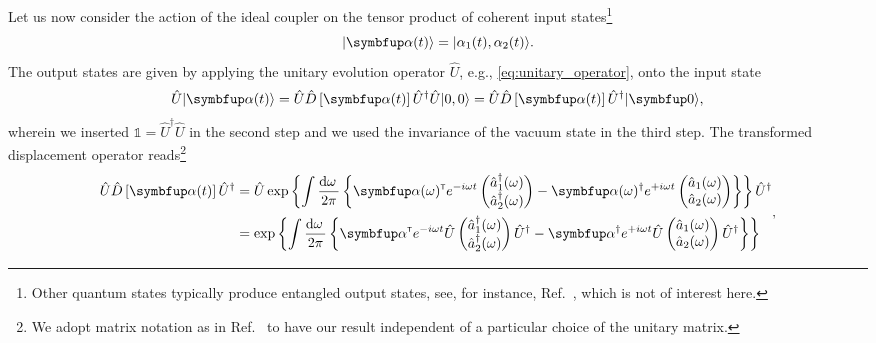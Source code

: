 Let us now consider the action of the ideal coupler on the tensor product of coherent input states\footnote{Other quantum states typically produce entangled output states, see, for instance, Ref.~\cite{Windhager2011}, which is not of interest here.}
\begin{equation}
	\ket*{\vb{\alpha}(t)}
	=
	\ket*{\alpha_1(t),\alpha_2(t)}
	.
\end{equation}
The output states are given by applying the unitary evolution operator $\hat{U}$, e.g., \cref{eq:unitary_operator}, onto the input state
\begin{equation}
	\hat{U}
	\ket*{\vb{\alpha}(t)}
	=
	\hat{U}
	\hat{D}\left[\vb{\alpha}(t)\right]
	\hat{U}^\dagger
	\hat{U}
	\ket*{0,0}
	=
	\hat{U}
	\hat{D}\left[\vb{\alpha}(t)\right]
	\hat{U}^\dagger
	\vacuum
	,
\end{equation}
wherein we inserted $\mathbb{1}=\hat{U}^\dagger\hat{U}$ in the second step and we used the invariance of the vacuum state in the third step.
The transformed displacement operator reads\footnote{We adopt matrix notation as in Ref.~\cite[p.~206]{Vogel2006} to have our result independent of a particular choice of the unitary matrix.}
\begin{equation}
	\begin{split}
		\hat{U}
		\hat{D}\left[\vb{\alpha}(t)\right]
		\hat{U}^\dagger
		&=
		\hat{U}
		\exp\left\{
			\int\frac{\dd{\omega}}{2\pi}
			\left\{
				\vb{\alpha}(\omega)^\trans
				e^{-i\omega t}
				\begin{pmatrix}
					\hat{a}_1^\dagger(\omega) \\
					\hat{a}_2^\dagger(\omega)
				\end{pmatrix}
				-
				\vb{\alpha}(\omega)^\dagger
				e^{+i\omega t}
				\begin{pmatrix}
					\hat{a}_1(\omega) \\
					\hat{a}_2(\omega)
				\end{pmatrix}
			\right\}
		\right\}
		\hat{U}^\dagger
		\\
		&=
		\exp\left\{
			\int\frac{\dd{\omega}}{2\pi}
			\left\{
				\vb{\alpha}^\trans
				e^{-i\omega t}
				\hat{U}
				\begin{pmatrix}
					\hat{a}_1^\dagger(\omega) \\
					\hat{a}_2^\dagger(\omega)
				\end{pmatrix}
				\hat{U}^\dagger
				-
				\vb{\alpha}^\dagger
				e^{+i\omega t}
				\hat{U}
				\begin{pmatrix}
					\hat{a}_1(\omega) \\
					\hat{a}_2(\omega)
				\end{pmatrix}
				\hat{U}^\dagger
			\right\}
		\right\}
	\end{split}
	\label{eq:displacement_operator_transformed}
	,
\end{equation}
